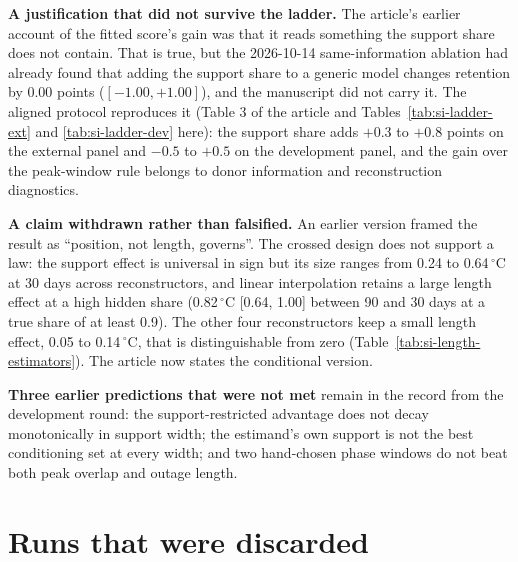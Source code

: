 \documentclass[draft]{agujournal2025}
\begin{document}
\textbf{A justification that did not survive the ladder.} The article's earlier
account of the fitted score's gain was that it reads something the support share
does not contain. That is true, but the 2026-10-14 same-information ablation had
already found that adding the support share to a generic model changes retention
by $0.00$ points ($[-1.00, +1.00]$), and the manuscript did not carry it. The
aligned protocol reproduces it (Table 3 of the article and Tables~\ref{tab:si-ladder-ext}
and \ref{tab:si-ladder-dev} here): the support share adds $+0.3$ to $+0.8$ points on the
external panel and $-0.5$ to $+0.5$ on the development panel, and the gain over the
peak-window rule belongs to donor information and reconstruction diagnostics.

\textbf{A claim withdrawn rather than falsified.} An earlier version framed the
result as ``position, not length, governs''. The crossed design does not support
a law: the support effect is universal in sign but its size ranges from 0.24 to
0.64\,$^{\circ}$C at 30 days across reconstructors, and linear interpolation
retains a large length effect at a high hidden share (0.82\,$^{\circ}$C
[0.64, 1.00] between 90 and 30 days at a true share of at least 0.9). The other
four reconstructors keep a small length effect, 0.05 to 0.14\,$^{\circ}$C, that
is distinguishable from zero (Table~\ref{tab:si-length-estimators}). The article now states the conditional version.

\textbf{Three earlier predictions that were not met} remain in the record from
the development round: the support-restricted advantage does not decay
monotonically in support width; the estimand's own support is not the best
conditioning set at every width; and two hand-chosen phase windows do not beat
both peak overlap and outage length.

\section{Runs that were discarded}
\end{document}

